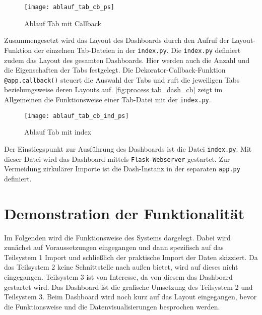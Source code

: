     \begin{figure}[H]
        \centering
            \texttt{[image: ablauf\_tab\_cb\_ps]}
            \caption{Ablauf Tab mit Callback}
            \label{fig:process tab_dash_cb}
    \end{figure}


    Zusammengesetzt wird das Layout des Dashboards durch den Aufruf der Layout-Funktion der einzelnen Tab-Dateien in der \texttt{index.py}.
    Die \texttt{index.py} definiert zudem das Layout des gesamten Dashboards. Hier werden auch die Anzahl und die Eigenschaften der Tabs festgelegt. 
    Die Dekorator-Callback-Funktion \texttt{@app.callback()} steuert die Auswahl der Tabs und ruft die jeweiligen Tabs beziehungsweise deren 
    Layouts auf. \autoref{fig:process tab_dash_cb} zeigt im Allgemeinen die Funktionsweise einer Tab-Datei mit der \texttt{index.py}.

    \begin{figure}[H]
        \centering
            \texttt{[image: ablauf\_tab\_cb\_ind\_ps]}
            \caption{Ablauf Tab mit index}
            \label{fig:process tab_dash_cb}
    \end{figure}

    Der Einstiegspunkt zur Ausführung des Dashboards ist die Datei \texttt{index.py}. Mit dieser Datei wird das Dashboard mittels \texttt{Flask-Webserver}
    gestartet. Zur Vermeidung zirkulärer Importe ist die Dash-Instanz in der separaten \texttt{app.py} definiert\cite[vgl.][]{plotly_url_2021}.



\section{Demonstration der Funktionalität}

    Im Folgenden wird die Funktionsweise des Systems dargelegt. Dabei wird zunächst auf Voraussetzungen eingegangen und dann
    spezifisch auf das Teilsystem 1 Import und schließlich der
    praktische Import der Daten skizziert. Da das Teilsystem 2 keine Schnittstelle
    nach außen bietet, wird auf dieses nicht eingegangen. Teilsystem 3 ist von Interesse, da von diesem das Dashboard
    gestartet wird. Das Dashboard ist die grafische Umsetzung des Teilsystem 2 und Teilsystem 3. Beim Dashboard wird noch kurz auf das Layout
    eingegangen, bevor die Funktionsweise und die Datenvisualisierungen besprochen werden.


